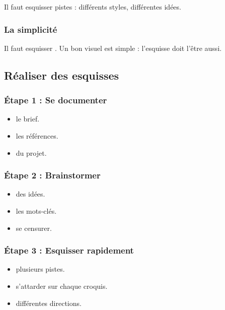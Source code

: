 Il faut esquisser  pistes : différents styles, différentes idées.

\subsubsection{La simplicité}

Il faut esquisser . Un bon visuel est simple : l'esquisse doit l'être aussi.

\subsection{Réaliser des esquisses}

\subsubsection{Étape 1 : Se documenter}

\begin{itemize}
    \item {} le brief.
    \item {} les références.
    \item {} du projet.
\end{itemize}

\subsubsection{Étape 2 : Brainstormer}

\begin{itemize}
    \item {} des idées.
    \item {} les mots-clés.
    \item {} se censurer.
\end{itemize}

\subsubsection{Étape 3 : Esquisser rapidement}

\begin{itemize}
    \item {} plusieurs pistes.
    \item {} s'attarder sur chaque croquis.
    \item {} différentes directions.
\end{itemize}

